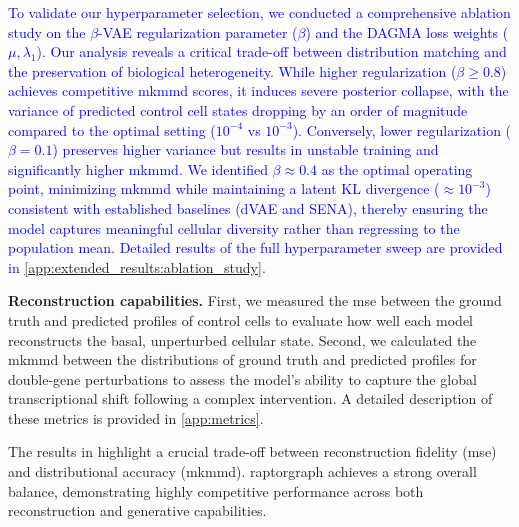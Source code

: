 \documentclass{article}
\begin{document}
\textcolor{blue}{
To validate our hyperparameter selection, we conducted a comprehensive ablation study on the $\beta$-VAE regularization parameter ($\beta$) and the DAGMA loss weights ($\mu, \lambda_1$).
Our analysis reveals a critical trade-off between distribution matching and the preservation of biological heterogeneity.
While higher regularization ($\beta \geq 0.8$) achieves competitive \gls{mkmmd} scores, it induces severe posterior collapse, with the variance of predicted control cell states dropping by an order of magnitude compared to the optimal setting ($10^{-4}$ vs $10^{-3}$).
Conversely, lower regularization ($\beta = 0.1$) preserves higher variance but results in unstable training and significantly higher \gls{mkmmd}.
We identified $\beta \approx 0.4$ as the optimal operating point, minimizing \gls{mkmmd} while maintaining a latent KL divergence ($\approx 10^{-3}$) consistent with established baselines (dVAE and SENA), thereby ensuring the model captures meaningful cellular diversity rather than regressing to the population mean.
Detailed results of the full hyperparameter sweep are provided in \cref{app:extended_results:ablation_study}.
}

\textbf{Reconstruction capabilities.} First, we measured the \gls{mse} between the ground truth and predicted profiles of control cells to evaluate how well each model reconstructs the basal, unperturbed cellular state.
Second, we calculated the \gls{mkmmd} between the distributions of ground truth and predicted profiles for double-gene perturbations to assess the model's ability to capture the global transcriptional shift following a complex intervention. A detailed description of these metrics is provided in \cref{app:metrics}. 

The results in  highlight a crucial trade-off between reconstruction fidelity (\gls{mse}) and distributional accuracy (\gls{mkmmd}).
\Gls{raptorgraph} achieves a strong overall balance, demonstrating highly competitive performance across both reconstruction and generative capabilities. 
\end{document}
